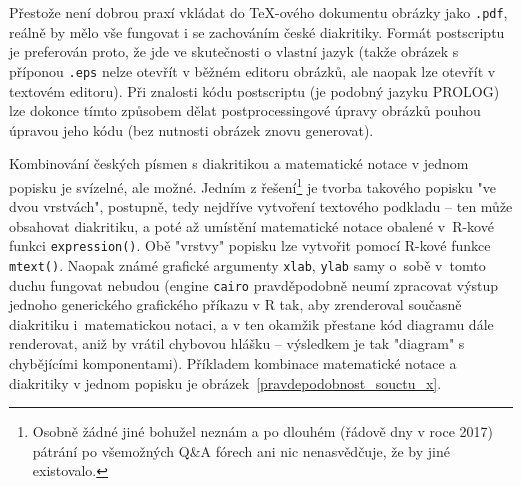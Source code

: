 \documentclass{article}
\begin{document}
Přestože není dobrou praxí vkládat do \TeX-ového dokumentu obrázky
jako \texttt{.pdf}, reálně by mělo vše fungovat i se zachováním
české diakritiky. Formát postscriptu je preferován proto, že jde
ve skutečnosti o vlastní jazyk (takže obrázek s příponou \texttt{.eps}
nelze otevřít v běžném editoru obrázků, ale naopak lze otevřít
v textovém editoru). Při znalosti kódu postscriptu (je podobný jazyku
PROLOG) lze dokonce tímto způsobem dělat postprocessingové
úpravy obrázků pouhou úpravou jeho kódu (bez nutnosti obrázek znovu
generovat).

Kombinování českých písmen s diakritikou a matematické notace v jednom
popisku je svízelné, ale možné. Jedním z řešení\footnote{Osobně žádné jiné
bohužel neznám a po dlouhém (řádově dny v roce 2017) pátrání po všemožných
Q\&A fórech ani nic nenasvědčuje, že by jiné existovalo.} je
tvorba takového popisku "ve dvou vrstvách", postupně, tedy nejdříve
vytvoření textového podkladu -- ten může obsahovat diakritiku,
a poté až umístění matematické notace obalené \mbox{v~\textsf{R}-kové}
funkci \texttt{expression()}. Obě "vrstvy" popisku lze vytvořit pomocí
\textsf{R}-kové funkce \texttt{mtext()}. Naopak známé grafické argumenty
\texttt{xlab}, \texttt{ylab} samy o~sobě v~tomto duchu fungovat nebudou
(engine \texttt{cairo} pravděpodobně neumí zpracovat výstup jednoho
generického grafického příkazu v \textsf{R} tak, aby zrenderoval
současně diakritiku i~matematickou notaci, a v ten okamžik přestane
kód diagramu dále renderovat, aniž by vrátil chybovou hlášku -- výsledkem
je tak "diagram" s chybějícími komponentami). Příkladem kombinace
matematické notace a diakritiky v jednom popisku je
obrázek~\ref{pravdepodobnost_souctu_x}.
\end{document}
